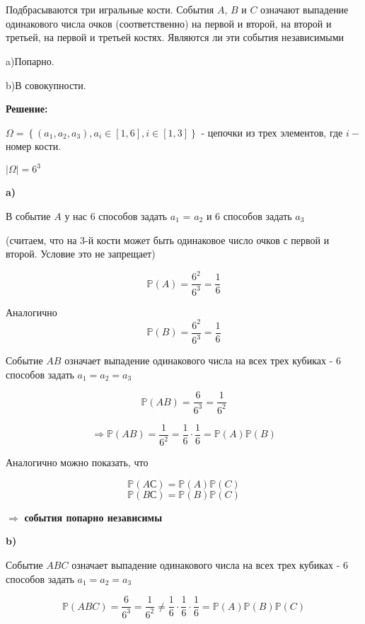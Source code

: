 \documentclass[a4paper,12pt]{article}
\newcommand{\lt}{\left}
\newcommand{\rt}{\right}
\newcommand{\bb}{\mathbb}
\begin{document}
\section{}

Подбрасываются три игральные кости. События $A$, $B$ и $C$ означают выпадение одинакового числа очков (соответственно) на первой и второй, на второй и
третьей, на первой и третьей костях. Являются ли эти события независимыми

a)Попарно.

b)В совокупности.

\vspace{\baselineskip}

\textbf{Решение:}

\vspace{\baselineskip}

$\Omega = \lt\{(a_1,a_2,a_3), a_i \in [1,6], i \in [1,3]\rt\}$ - цепочки из трех элементов, где $i - $ номер кости.

$|\Omega| = 6^3$  

\textbf{a)}

В событие $A$ у нас 6 способов задать $a_1$ = $a_2$ и 6 способов задать $a_3$

(считаем, что на 3-й кости может быть одинаковое число очков с первой и второй. Условие это не запрещает)

$$\bb P(A) = \dfrac{6^2}{6^3} = \dfrac{1}{6} $$

Аналогично $$\bb P(B) = \dfrac{6^2}{6^3} = \dfrac{1}{6} $$

Событие $AB$ означает выпадение одинакового числа на всех трех кубиках - 6 способов задать $a_1 = a_2 = a_3$

$$\bb P(AB) = \dfrac{6}{6^3} = \dfrac{1}{6^2} $$

$$\Rightarrow\bb P(AB) = \dfrac{1}{6^2} = \dfrac{1}{6}\cdot\dfrac{1}{6} =\bb P(A) \bb P(B)$$

Аналогично можно показать, что 

$$\bb P(AС) = \bb P(A) \bb P(C)$$
$$\bb P(BС) = \bb P(B) \bb P(C)$$

$\Rightarrow $ \textbf{события попарно независимы}

\textbf{b)}

Событие $ABC$ означает выпадение одинакового числа на всех трех кубиках - 6 способов задать $a_1 = a_2 = a_3$

$$\bb P(ABC) = \dfrac{6}{6^3} = \dfrac{1}{6^2} \neq \dfrac{1}{6}\cdot\dfrac{1}{6}\cdot\dfrac{1}{6} = \bb P(A)\bb P(B) \bb P(C)$$
\end{document}
